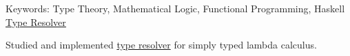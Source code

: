 \begin{cventries}
\cventry
    {Keywords: Type Theory, Mathematical Logic, Functional Programming, Haskell}
    {\href{https://github.com/dzhiblavi/tt-type-resolve-unification/}{\underline{Type Resolver}}}
    {}
    {}
    {
     \begin{cvitems} %
        \item {
            Studied and implemented \underline{type resolver} for simply typed lambda calculus.
        }
      \end{cvitems}
    }
    

\end{cventries}


